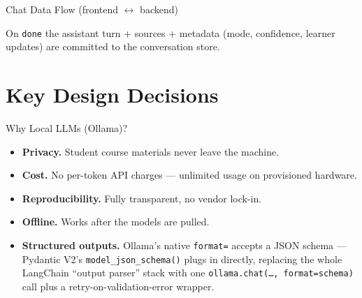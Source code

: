 \documentclass[aspectratio=169, 10pt]{beamer}
\begin{document}
\begin{frame}{Chat Data Flow (frontend $\leftrightarrow$ backend)}
  \centering

  \vspace{0.15cm}
  \scriptsize
  On \texttt{done} the assistant turn + sources + metadata (mode,
  confidence, learner updates) are committed to the conversation store.
\end{frame}

\section{Key Design Decisions}

\begin{frame}{Why Local LLMs (Ollama)?}
  \begin{itemize}
    \item \textbf{Privacy.} Student course materials never leave the
          machine.
    \item \textbf{Cost.} No per-token API charges --- unlimited usage on
          provisioned hardware.
    \item \textbf{Reproducibility.} Fully transparent, no vendor lock-in.
    \item \textbf{Offline.} Works after the models are pulled.
    \item \textbf{Structured outputs.} Ollama's native \texttt{format=}
          accepts a JSON schema --- Pydantic V2's
          \texttt{model\_json\_schema()} plugs in directly, replacing
          the whole LangChain ``output parser'' stack with one
          \texttt{ollama.chat(\dots, format=schema)} call plus a
          retry-on-validation-error wrapper.
  \end{itemize}
\end{frame}
\end{document}
